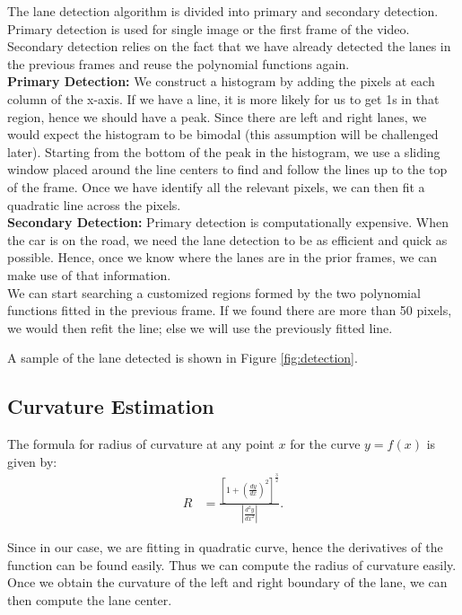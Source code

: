 \documentclass[12pt,twoside]{article}
\begin{document}
The lane detection algorithm is divided into primary and secondary detection. Primary detection is used for single image or the first frame of the video. Secondary detection relies on the fact that we have already detected the lanes in the previous frames and reuse the polynomial functions again.\\

\textbf{Primary Detection: } We construct a histogram by adding the pixels at each column of the x-axis. If we have a line, it is more likely for us to get 1s in that region, hence we should have a peak. Since there are left and right lanes, we would expect the histogram to be bimodal (this assumption will be challenged later). Starting from the bottom of the peak in the histogram, we use a sliding window placed around the line centers to find and follow the lines up to the top of the frame. Once we have identify all the relevant pixels, we can then fit a quadratic line across the pixels.\\

\textbf{Secondary Detection: } Primary detection is computationally expensive. When the car is on the road, we need the lane detection to be as efficient and quick as possible. Hence, once we know where the lanes are in the prior frames, we can make use of that information. \\

We can start searching a customized regions formed by the two polynomial functions fitted in the previous frame. 
If we found there are more than 50 pixels, we would then refit the line; else we will use the previously fitted line.

A sample of the lane detected is shown in Figure \ref{fig:detection}.



\subsection{Curvature Estimation}

The formula for radius of curvature at any point $x$ for the curve $y = f(x)$ is given by:
\begin{align*}
R & = \frac{\left[1 + \left(\frac{dy}{dx}\right)^2\right]^\frac{3}{2}}{\left\vert \frac{d^2y}{dx^2}\right\vert}.
\end{align*}

Since in our case, we are fitting in quadratic curve, hence the derivatives of the function can be found easily. Thus we can compute the radius of curvature easily. Once we obtain the curvature of the left and right boundary of the lane, we can then compute the lane center. \\
\end{document}
